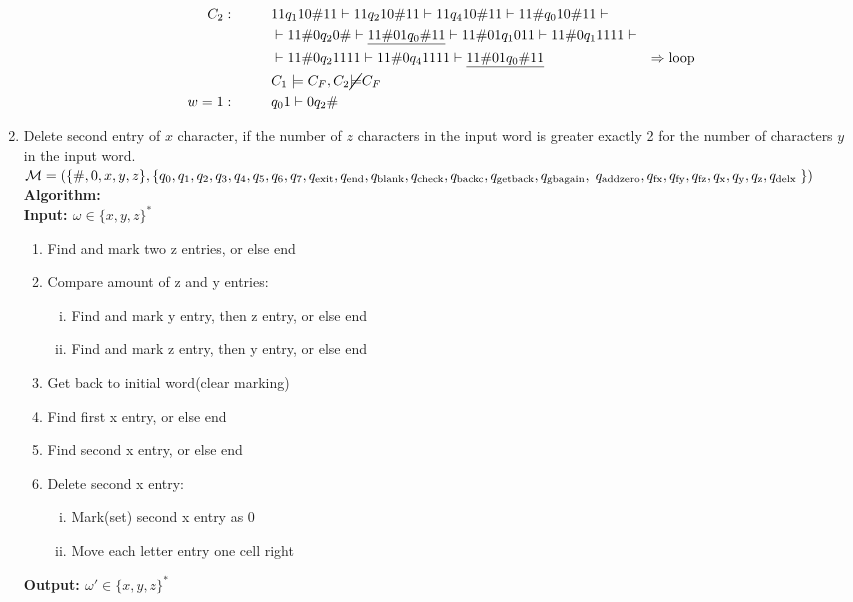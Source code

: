 \documentclass[a4paper,12pt, centered]{article}
\newcommand\tab[1][1cm]{\hspace*{#1}}
\begin{document}
\begin{enumerate}
\begin{align*}
			C_2:\tab&11q_110\#11\vdash11q_210\#11\vdash11q_410\#11\vdash11\#q_010\#11\vdash&\\&\vdash11\#0q_20\#\vdash\underline{11\#01q_0\#11}\vdash11\#01q_1011\vdash11\#0q_11111\vdash&\\&\vdash11\#0q_21111\vdash11\#0q_41111\vdash\underline{11\#01q_0\#11}&\Rightarrow\textrm{loop}\\&C_1\models C_F,C_2\cancel{\models}C_F\\
			w=1:\tab&q_01\vdash0q_2\#
		\end{align*}
		\item Delete second entry of $x$ character, if the number of $z$ characters in the input word is greater
exactly 2 for the number of characters $y$ in the input word.\\$\mathcal{M}=\left(\{\#, 0, x,y,z\},\{q_0,q_1,q_2,q_3,q_4,q_5,q_6,q_7,q_{\textrm{exit}},q_{\textrm{end}},q_{\textrm{blank}},q_{\textrm{check}},q_{\textrm{backc}},q_{\textrm{getback}},q_{\textrm{gbagain}},\right.\\q_{\textrm{addzero}},q_{\textrm{fx}} ,q_{\textrm{fy}},q_{\textrm{fz}},q_{\textrm{x}} ,q_{\textrm{y}},q_{\textrm{z}},q_{\textrm{delx}}     \left.\} \right) \\$
		\textbf{Algorithm:\\\tab Input: $\omega\in\{x,y,z\}^*$}
		\begin{enumerate}[(1)]
			\item Find and mark two z entries, or else end
			\item Compare amount of z and y entries: \begin{enumerate}[(i)]
			\item Find and mark y entry, then z entry, or else end
			\item Find and mark z entry, then y entry, or else end
		\end{enumerate}
			\item Get back to initial word(clear marking)
			\item Find first x entry, or else end
			\item Find second x entry, or else end
			\item Delete second x entry: \begin{enumerate}[(i)]
			\item Mark(set) second x entry as 0
			\item Move each letter entry one cell right
		\end{enumerate}
		\end{enumerate}
		\textbf{\tab Output: $\omega'\in\{x,y,z\}^*$}

\end{enumerate}
\end{document}
